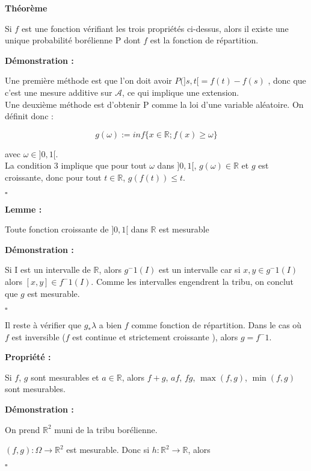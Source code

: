 \documentclass[10pt,a4paper,notitlepage ]{report}
\newcommand{\R}{\mathbb R}
\newcounter{th}
\newenvironment{theorem}[1][]{
\refstepcounter{th}
\begin{tcolorbox}
	\textbf{Théorème \theth \ #1}
	
	
}{\end{tcolorbox}}
\newenvironment{propriete}[1][]{
	\begin{tcolorbox}
		\textbf{Propriété #1 : }
}
{\end{tcolorbox}}
\newenvironment{demo}[1][]{

	\textbf{Démonstration #1 :}
}{\begin{flushright}
	$\square$
\end{flushright}
}
\newenvironment{lemme}[1][]{
	\begin{tcolorbox}
		\textbf{Lemme #1 : }
	}
	{\end{tcolorbox}}
\begin{document}
\begin{theorem}
Si $f$ est une fonction vérifiant les trois propriétés ci-dessus, alors il existe une unique probabilité borélienne P dont $f$ est la fonction de répartition.
\end{theorem}

\begin{demo}

Une première méthode est que l'on doit avoir $P(]s,t[ = f(t) - f(s) $ , donc que c'est une mesure additive sur $\mathcal{A}$, ce qui implique une extension. \\

Une deuxième méthode est d'obtenir P comme la loi d'une variable aléatoire. On définit donc : 

$$g(\omega) := inf \lbrace x \in \R ; f(x) \geq \omega \rbrace$$


avec $\omega \in ]0,1[$. \\

La condition 3 implique que pour tout $\omega$ dans $]0,1[$, $g(\omega ) \in \R$ et $g$ est croissante, donc pour tout $t \in \mathbb{R} $, $ g(f(t)) \leq t$. 

\end{demo}

\begin{lemme}
Toute fonction croissante de $]0,1[$ dans $\R$ est mesurable 
\end{lemme}

\begin{demo}

Si I est un intervalle de $\mathbb{R}$, alors $ g^-1 (I) $ est un intervalle car si $x,y \in g^-1 (I) $ alors $[x,y] \in f^-1 (I) $. Comme les intervalles engendrent la tribu, on conclut que $g$ est mesurable. 

\end{demo}

Il reste à vérifier que $g_*  \lambda $ a bien $f$ comme fonction de répartition. Dans le cas où $f$ est inversible ($f$ est continue et strictement croissante ), alors $g = f^-1$.

\begin{propriete}
Si $f$, $g$ sont mesurables et $a \in \R$, alors $f+g$, $af$, $fg$, $\max (f,g)$, $\min (f,g)$ sont mesurables.
\end{propriete}

\begin{demo}
On prend $\R ^2$ muni de la tribu borélienne.

$(f,g) : \Omega \longrightarrow \R ^2 $ est mesurable. Donc si $h : \R ^2 \rightarrow \R $, alors 

\end{demo}
\end{document}
